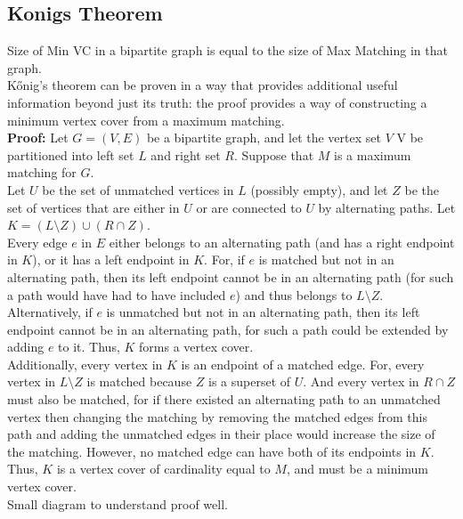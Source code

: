 \documentclass[8pt, a4paper, oneside, twocolumn]{extarticle}
\begin{document}
\subsection{Konigs Theorem}
Size of Min VC in a bipartite graph is equal to the size of Max Matching in that graph.
\\Kőnig's theorem can be proven in a way that provides additional useful information beyond just its truth: the proof provides a way of constructing a minimum vertex cover from a maximum matching.
\\\textbf{Proof: } Let $G = (V, E)$ be a bipartite graph, and let the vertex set $V$ V be partitioned into left set $L$ and right set $R$. Suppose that $M$ is a maximum matching for $G$.
\\Let $U$ be the set of unmatched vertices in $L$ (possibly empty), and let $Z$ be the set of vertices that are either in $U$ or are connected to $U$ by alternating paths. Let $K = ( L \setminus Z ) \cup ( R \cap Z )$. 
\\Every edge $e$ in $E$ either belongs to an alternating path (and has a right endpoint in $K$), or it has a left endpoint in $K$. For, if $e$ is matched but not in an alternating path, then its left endpoint cannot be in an alternating path (for such a path would have had to have included $e$) and thus belongs to $L \setminus Z$. Alternatively, if $e$ is unmatched but not in an alternating path, then its left endpoint cannot be in an alternating path, for such a path could be extended by adding $e$ to it. Thus, $K$ forms a vertex cover.\\
Additionally, every vertex in $K$ is an endpoint of a matched edge. For, every vertex in $L \setminus Z$ is matched because $Z$ is a superset of $U$. And every vertex in $R \cap Z$ must also be matched, for if there existed an alternating path to an unmatched vertex then changing the matching by removing the matched edges from this path and adding the unmatched edges in their place would increase the size of the matching. However, no matched edge can have both of its endpoints in $K$. Thus, $K$ is a vertex cover of cardinality equal to $M$, and must be a minimum vertex cover.
\\Small diagram to understand proof well.
\end{document}
